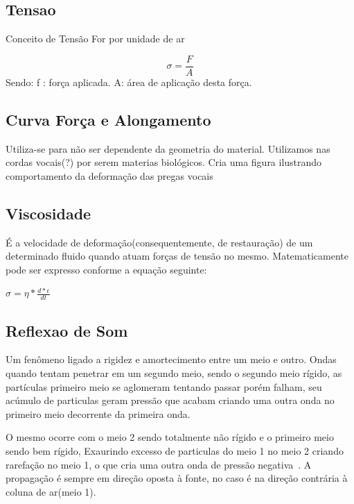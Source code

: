 	\subsection{Tensao}
		Conceito de Tensão For por unidade de ar
		
		\[
		\sigma = \frac{F}{A}
		\]
		Sendo:
		f : força aplicada. \linebreak
		A: área de aplicação desta força.
		
	\subsection{Curva Força e Alongamento}
		Utiliza-se para não ser dependente da geometria do material. Utilizamos nas cordas vocais(?) por serem materias biológicos. Cria uma figura ilustrando comportamento da deformação das pregas vocais

		
	\subsection{Viscosidade}
		É a velocidade de deformação(consequentemente, de restauração) de
		um determinado fluido quando atuam forças de tensão no mesmo. Matematicamente
		pode ser expresso conforme a equação seguinte: 
		
		$
		\sigma = \eta * \frac{d*\epsilon}{dt}
		$
	
	\subsection{Reflexao de Som}
	
		Um fenômeno ligado a rigidez e amortecimento entre um meio e outro.\cite{MTAGENTE}
		Ondas quando tentam penetrar em um segundo meio, sendo o segundo meio rígido, as partículas primeiro meio se aglomeram tentando passar porém
		falham, seu acúmulo de particulas geram pressão que acabam criando uma outra onda no primeiro meio decorrente da primeira onda.\cite{HenryGray}
		
		O mesmo ocorre com o meio 2 sendo totalmente não rígido e o primeiro meio sendo bem rígido, Exaurindo excesso de particulas  do meio 1 no meio 2 criando rarefação no meio 1, o que cria uma outra onda de pressão negativa~\cite{FlanaganLandgraf}. A propagação é sempre em direção oposta à fonte, no caso é na direção contrária à coluna de ar(meio 1). 
		
	
	
